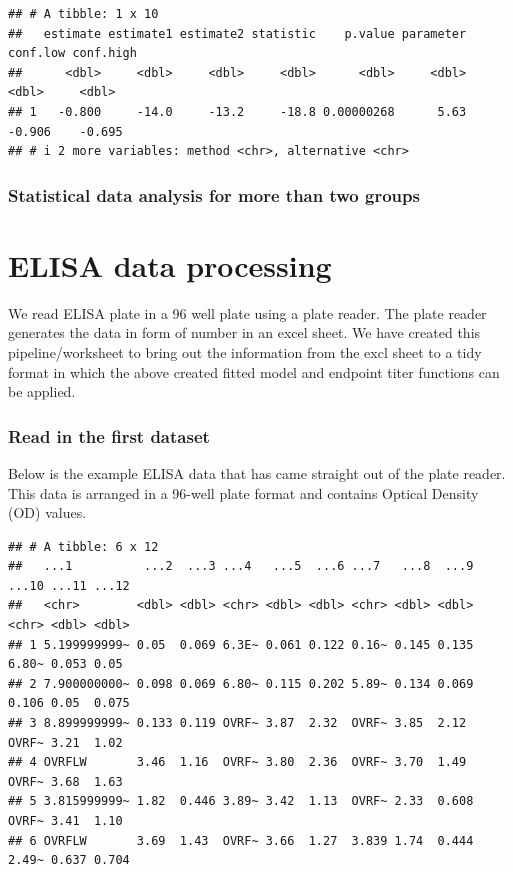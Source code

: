 \documentclass[
]{book}
\begin{document}
\begin{verbatim}
## # A tibble: 1 x 10
##   estimate estimate1 estimate2 statistic    p.value parameter conf.low conf.high
##      <dbl>     <dbl>     <dbl>     <dbl>      <dbl>     <dbl>    <dbl>     <dbl>
## 1   -0.800     -14.0     -13.2     -18.8 0.00000268      5.63   -0.906    -0.695
## # i 2 more variables: method <chr>, alternative <chr>
\end{verbatim}

\subsubsection{Statistical data analysis for more than two groups}\label{statistical-data-analysis-for-more-than-two-groups}

\section{ELISA data processing}\label{elisa-data-processing}

We read ELISA plate in a 96 well plate using a plate reader. The plate reader generates the data in form of number in an excel sheet. We have created this pipeline/worksheet to bring out the information from the excl sheet to a tidy format in which the above created fitted model and endpoint titer functions can be applied.

\subsubsection{Read in the first dataset}\label{read-in-the-first-dataset}

Below is the example ELISA data that has came straight out of the plate reader. This data is arranged in a 96-well plate format and contains Optical Density (OD) values.

\begin{verbatim}
## # A tibble: 6 x 12
##   ...1          ...2  ...3 ...4   ...5  ...6 ...7   ...8  ...9 ...10 ...11 ...12
##   <chr>        <dbl> <dbl> <chr> <dbl> <dbl> <chr> <dbl> <dbl> <chr> <dbl> <dbl>
## 1 5.199999999~ 0.05  0.069 6.3E~ 0.061 0.122 0.16~ 0.145 0.135 6.80~ 0.053 0.05 
## 2 7.900000000~ 0.098 0.069 6.80~ 0.115 0.202 5.89~ 0.134 0.069 0.106 0.05  0.075
## 3 8.899999999~ 0.133 0.119 OVRF~ 3.87  2.32  OVRF~ 3.85  2.12  OVRF~ 3.21  1.02 
## 4 OVRFLW       3.46  1.16  OVRF~ 3.80  2.36  OVRF~ 3.70  1.49  OVRF~ 3.68  1.63 
## 5 3.815999999~ 1.82  0.446 3.89~ 3.42  1.13  OVRF~ 2.33  0.608 OVRF~ 3.41  1.10 
## 6 OVRFLW       3.69  1.43  OVRF~ 3.66  1.27  3.839 1.74  0.444 2.49~ 0.637 0.704
\end{verbatim}
\end{document}
